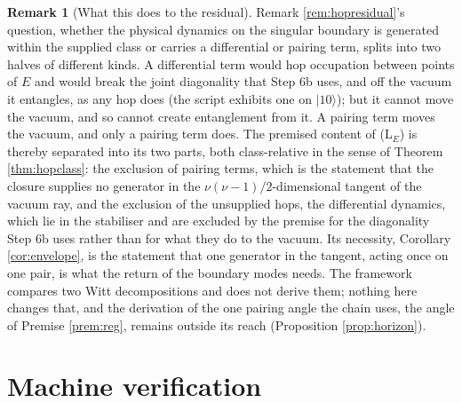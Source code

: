 \documentclass[11pt]{article}
\theoremstyle{definition}
\newtheorem{remark}[theorem]{Remark}
\begin{document}
\begin{remark}[What this does to the residual]\label{rem:residualsplit}
Remark \ref{rem:hopresidual}'s question, whether the physical dynamics on the singular boundary is generated within the supplied class or carries a differential or pairing term, splits into two halves of different kinds. A differential term would hop occupation between points of $E$ and would break the joint diagonality that Step 6b uses, and off the vacuum it entangles, as any hop does (the script exhibits one on $|10\rangle$); but it cannot move the vacuum, and so cannot create entanglement from it. A pairing term moves the vacuum, and only a pairing term does. The premised content of (L$_E$) is thereby separated into its two parts, both class-relative in the sense of Theorem \ref{thm:hopclass}: the exclusion of pairing terms, which is the statement that the closure supplies no generator in the $\nu(\nu - 1)/2$-dimensional tangent of the vacuum ray, and the exclusion of the unsupplied hops, the differential dynamics, which lie in the stabiliser and are excluded by the premise for the diagonality Step 6b uses rather than for what they do to the vacuum. Its necessity, Corollary \ref{cor:envelope}, is the statement that one generator in the tangent, acting once on one pair, is what the return of the boundary modes needs. The framework compares two Witt decompositions and does not derive them; nothing here changes that, and the derivation of the one pairing angle the chain uses, the angle of Premise \ref{prem:reg}, remains outside its reach (Proposition \ref{prop:horizon}).
\end{remark}

\section{Machine verification}\label{sec:verification}
\end{document}
